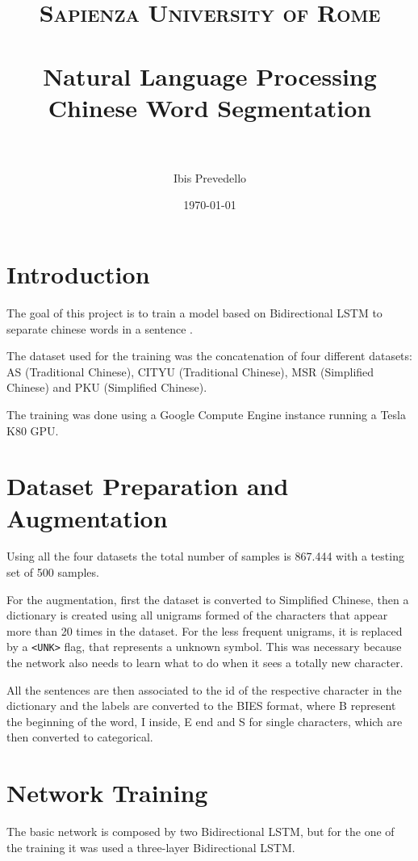 \documentclass{article}
\title{
\normalfont \normalsize
\textsc{Sapienza University of Rome} \\ [25pt] %
\horrule{0.5pt} \\[0.4cm] %
\LARGE Natural Language Processing \\ %
\large Chinese Word Segmentation \\
\horrule{2pt} \\[0.5cm] %
}
\author{Ibis Prevedello} %
\date{\normalsize\today} %
\begin{document}


\section{Introduction}

The goal of this project is to train a model based on Bidirectional LSTM to separate chinese words in a sentence \cite{paper}.

The dataset used for the training was the concatenation of four different datasets: AS (Traditional Chinese), CITYU (Traditional Chinese), MSR (Simplified Chinese) and PKU (Simplified Chinese).

The training was done using a Google Compute Engine instance running a Tesla K80 GPU.



\section{Dataset Preparation and Augmentation}

Using all the four datasets the total number of samples is 867.444 with a testing set of 500 samples.

For the augmentation, first the dataset is converted to Simplified Chinese, then a dictionary is created using all unigrams formed of the characters that appear more than 20 times in the dataset. For the less frequent unigrams, it is replaced by a \verb|<UNK>| flag, that represents a unknown symbol. This was necessary because the network also needs to learn what to do when it sees a totally new character.

All the sentences are then associated to the id of the respective character in the dictionary and the labels are converted to the BIES format, where B represent the beginning of the word, I inside, E end and S for single characters, which are then converted to categorical.

\newpage
\section{Network Training}

The basic network is composed by two Bidirectional LSTM, but for the one of the training it was used a three-layer Bidirectional LSTM.
\end{document}
